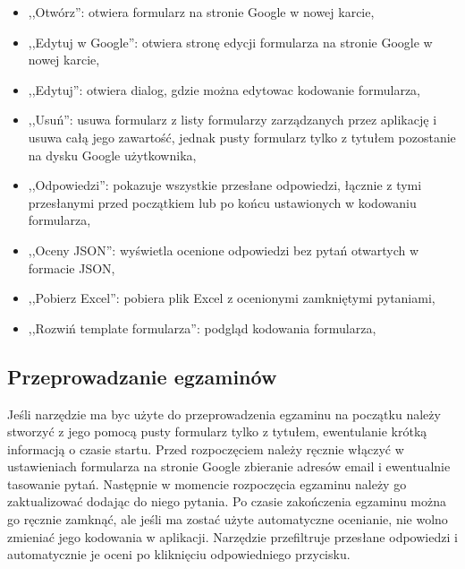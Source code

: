 \begin{itemize}
  \item ,,Otwórz'': otwiera formularz na stronie Google w nowej karcie,
  \item ,,Edytuj w Google'': otwiera stronę edycji formularza na stronie Google
    w nowej karcie,
  \item ,,Edytuj'': otwiera dialog, gdzie można edytowac kodowanie formularza,
  \item ,,Usuń'': usuwa formularz z listy formularzy zarządzanych przez aplikację
    i usuwa całą jego zawartość, jednak pusty formularz tylko z tytułem pozostanie 
    na dysku Google użytkownika,
  \item ,,Odpowiedzi'': pokazuje wszystkie przesłane odpowiedzi, łącznie z tymi
    przesłanymi przed początkiem lub po końcu ustawionych w kodowaniu formularza,
  \item ,,Oceny JSON'': wyświetla ocenione odpowiedzi bez pytań otwartych w formacie
    JSON,
  \item ,,Pobierz Excel'': pobiera plik Excel z ocenionymi zamkniętymi pytaniami,
  \item ,,Rozwiń template formularza'': podgląd kodowania formularza,
\end{itemize}

\subsection{Przeprowadzanie egzaminów}
Jeśli narzędzie ma byc użyte do przeprowadzenia egzaminu na początku należy stworzyć
z jego pomocą pusty formularz tylko z tytułem, ewentulanie krótką informacją o czasie
startu. Przed rozpoczęciem należy ręcznie włączyć w ustawieniach formularza na stronie
Google zbieranie adresów email i ewentualnie tasowanie pytań. Następnie w momencie
rozpoczęcia egzaminu należy go zaktualizować dodając do niego pytania.
Po czasie zakończenia egzaminu można go ręcznie zamknąć, ale jeśli ma zostać użyte
automatyczne ocenianie, nie wolno zmieniać jego kodowania w aplikacji. Narzędzie
przefiltruje przesłane odpowiedzi i automatycznie je oceni po kliknięciu
odpowiedniego przycisku.

